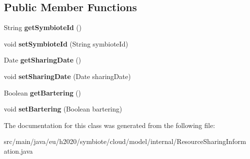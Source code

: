 \subsection*{Public Member Functions}
\begin{DoxyCompactItemize}
\item 
\mbox{\label{classeu_1_1h2020_1_1symbiote_1_1cloud_1_1model_1_1internal_1_1ResourceSharingInformation_a5756593fbbd35b40e09c831e9702a739}} 
String {\bfseries get\+Symbiote\+Id} ()
\item 
\mbox{\label{classeu_1_1h2020_1_1symbiote_1_1cloud_1_1model_1_1internal_1_1ResourceSharingInformation_aab437bd5425bebeabbde8c1ef3df80da}} 
void {\bfseries set\+Symbiote\+Id} (String symbiote\+Id)
\item 
\mbox{\label{classeu_1_1h2020_1_1symbiote_1_1cloud_1_1model_1_1internal_1_1ResourceSharingInformation_ad3e71a6bd66f75171edc83beaca08176}} 
Date {\bfseries get\+Sharing\+Date} ()
\item 
\mbox{\label{classeu_1_1h2020_1_1symbiote_1_1cloud_1_1model_1_1internal_1_1ResourceSharingInformation_a78a1a63a16faa408aaeceaf87dd57f9f}} 
void {\bfseries set\+Sharing\+Date} (Date sharing\+Date)
\item 
\mbox{\label{classeu_1_1h2020_1_1symbiote_1_1cloud_1_1model_1_1internal_1_1ResourceSharingInformation_ae1d6a130e594c44b7f93d6c59e9e94a2}} 
Boolean {\bfseries get\+Bartering} ()
\item 
\mbox{\label{classeu_1_1h2020_1_1symbiote_1_1cloud_1_1model_1_1internal_1_1ResourceSharingInformation_a6d48a66ca0f37e5b234fbc8d65d7f4b7}} 
void {\bfseries set\+Bartering} (Boolean bartering)
\end{DoxyCompactItemize}


The documentation for this class was generated from the following file\+:\begin{DoxyCompactItemize}
\item 
src/main/java/eu/h2020/symbiote/cloud/model/internal/Resource\+Sharing\+Information.\+java\end{DoxyCompactItemize}
